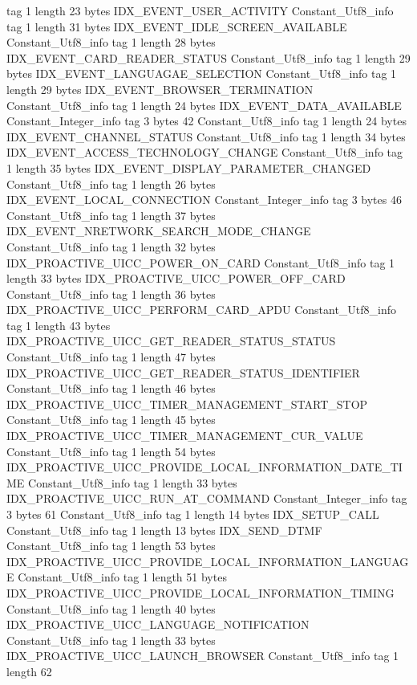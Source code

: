 {{{			tag	1
			length	23
			bytes	IDX_EVENT_USER_ACTIVITY
		}
		Constant_Utf8_info {
			tag	1
			length	31
			bytes	IDX_EVENT_IDLE_SCREEN_AVAILABLE
		}
		Constant_Utf8_info {
			tag	1
			length	28
			bytes	IDX_EVENT_CARD_READER_STATUS
		}
		Constant_Utf8_info {
			tag	1
			length	29
			bytes	IDX_EVENT_LANGUAGAE_SELECTION
		}
		Constant_Utf8_info {
			tag	1
			length	29
			bytes	IDX_EVENT_BROWSER_TERMINATION
		}
		Constant_Utf8_info {
			tag	1
			length	24
			bytes	IDX_EVENT_DATA_AVAILABLE
		}
		Constant_Integer_info {
			tag	3
			bytes	42
		}
		Constant_Utf8_info {
			tag	1
			length	24
			bytes	IDX_EVENT_CHANNEL_STATUS
		}
		Constant_Utf8_info {
			tag	1
			length	34
			bytes	IDX_EVENT_ACCESS_TECHNOLOGY_CHANGE
		}
		Constant_Utf8_info {
			tag	1
			length	35
			bytes	IDX_EVENT_DISPLAY_PARAMETER_CHANGED
		}
		Constant_Utf8_info {
			tag	1
			length	26
			bytes	IDX_EVENT_LOCAL_CONNECTION
		}
		Constant_Integer_info {
			tag	3
			bytes	46
		}
		Constant_Utf8_info {
			tag	1
			length	37
			bytes	IDX_EVENT_NRETWORK_SEARCH_MODE_CHANGE
		}
		Constant_Utf8_info {
			tag	1
			length	32
			bytes	IDX_PROACTIVE_UICC_POWER_ON_CARD
		}
		Constant_Utf8_info {
			tag	1
			length	33
			bytes	IDX_PROACTIVE_UICC_POWER_OFF_CARD
		}
		Constant_Utf8_info {
			tag	1
			length	36
			bytes	IDX_PROACTIVE_UICC_PERFORM_CARD_APDU
		}
		Constant_Utf8_info {
			tag	1
			length	43
			bytes	IDX_PROACTIVE_UICC_GET_READER_STATUS_STATUS
		}
		Constant_Utf8_info {
			tag	1
			length	47
			bytes	IDX_PROACTIVE_UICC_GET_READER_STATUS_IDENTIFIER
		}
		Constant_Utf8_info {
			tag	1
			length	46
			bytes	IDX_PROACTIVE_UICC_TIMER_MANAGEMENT_START_STOP
		}
		Constant_Utf8_info {
			tag	1
			length	45
			bytes	IDX_PROACTIVE_UICC_TIMER_MANAGEMENT_CUR_VALUE
		}
		Constant_Utf8_info {
			tag	1
			length	54
			bytes	IDX_PROACTIVE_UICC_PROVIDE_LOCAL_INFORMATION_DATE_TIME
		}
		Constant_Utf8_info {
			tag	1
			length	33
			bytes	IDX_PROACTIVE_UICC_RUN_AT_COMMAND
		}
		Constant_Integer_info {
			tag	3
			bytes	61
		}
		Constant_Utf8_info {
			tag	1
			length	14
			bytes	IDX_SETUP_CALL
		}
		Constant_Utf8_info {
			tag	1
			length	13
			bytes	IDX_SEND_DTMF
		}
		Constant_Utf8_info {
			tag	1
			length	53
			bytes	IDX_PROACTIVE_UICC_PROVIDE_LOCAL_INFORMATION_LANGUAGE
		}
		Constant_Utf8_info {
			tag	1
			length	51
			bytes	IDX_PROACTIVE_UICC_PROVIDE_LOCAL_INFORMATION_TIMING
		}
		Constant_Utf8_info {
			tag	1
			length	40
			bytes	IDX_PROACTIVE_UICC_LANGUAGE_NOTIFICATION
		}
		Constant_Utf8_info {
			tag	1
			length	33
			bytes	IDX_PROACTIVE_UICC_LAUNCH_BROWSER
		}
		Constant_Utf8_info {
			tag	1
			length	62
}}}
